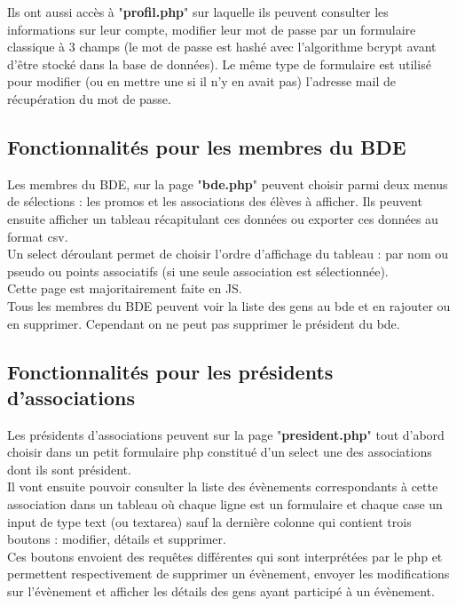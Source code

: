 \documentclass[french]{article}
\begin{document}
	Ils ont aussi accès à "\textbf{profil.php}" sur laquelle ils peuvent consulter les informations sur leur compte, modifier leur mot de passe par un formulaire classique à 3 champs (le mot de passe est hashé avec l'algorithme bcrypt avant d'être stocké dans la base de données). Le même type de formulaire est utilisé pour modifier (ou en mettre une si il n'y en avait pas) l'adresse mail de récupération du mot de passe.
	
\subsection{Fonctionnalités pour les membres du BDE}
	Les membres du BDE, sur la page "\textbf{bde.php}" peuvent choisir parmi deux menus de sélections : les promos et les associations des élèves à afficher. Ils peuvent ensuite afficher un tableau récapitulant ces données ou exporter ces données au format csv.\\ Un select déroulant permet de choisir l'ordre d'affichage du tableau : par nom ou pseudo ou points associatifs (si une seule association est sélectionnée).\\
	
	Cette page est majoritairement faite en JS. \\
	
	Tous les membres du BDE peuvent voir la liste des gens au bde et en rajouter ou en supprimer. Cependant on ne peut pas supprimer le président du bde. 

\subsection{Fonctionnalités pour les présidents d'associations}	
	Les présidents d'associations peuvent sur la page "\textbf{president.php}" tout d'abord choisir dans un petit formulaire php constitué d'un select une des associations dont ils sont président.\\
	
	Il vont ensuite pouvoir consulter la liste des évènements correspondants à cette association dans un tableau où chaque ligne est un formulaire et chaque case un input de type text (ou textarea) sauf la dernière colonne qui contient trois boutons : modifier, détails et supprimer.\\
	
	Ces boutons envoient des requêtes différentes qui sont interprétées par le php et permettent respectivement de supprimer un évènement, envoyer les modifications sur l'évènement et afficher les détails des gens ayant participé à un évènement. \\
	
\end{document}
